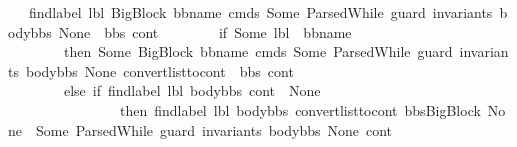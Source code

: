 \begin{isabellebody}
\ \ {\isacharbar}{\kern0pt}\ {\isachardoublequoteopen}find{\isacharunderscore}{\kern0pt}label\ lbl\ {\isacharparenleft}{\kern0pt}{\isacharparenleft}{\kern0pt}BigBlock\ bb{\isacharunderscore}{\kern0pt}name\ cmds\ {\isacharparenleft}{\kern0pt}Some\ {\isacharparenleft}{\kern0pt}ParsedWhile\ guard\ invariants\ body{\isacharunderscore}{\kern0pt}bbs{\isacharparenright}{\kern0pt}{\isacharparenright}{\kern0pt}\ None{\isacharparenright}{\kern0pt}\ {\isacharhash}{\kern0pt}\ bbs{\isacharparenright}{\kern0pt}\ cont\ {\isacharequal}{\kern0pt}\ \isanewline
\ \ \ \ \ \ {\isacharparenleft}{\kern0pt}if\ {\isacharparenleft}{\kern0pt}Some\ lbl\ {\isacharequal}{\kern0pt}\ bb{\isacharunderscore}{\kern0pt}name{\isacharparenright}{\kern0pt}\ \isanewline
\ \ \ \ \ \ \ \ then\ {\isacharparenleft}{\kern0pt}Some\ {\isacharparenleft}{\kern0pt}{\isacharparenleft}{\kern0pt}BigBlock\ bb{\isacharunderscore}{\kern0pt}name\ cmds\ {\isacharparenleft}{\kern0pt}Some\ {\isacharparenleft}{\kern0pt}ParsedWhile\ guard\ invariants\ body{\isacharunderscore}{\kern0pt}bbs{\isacharparenright}{\kern0pt}{\isacharparenright}{\kern0pt}\ None{\isacharparenright}{\kern0pt}{\isacharcomma}{\kern0pt}\ {\isacharparenleft}{\kern0pt}convert{\isacharunderscore}{\kern0pt}list{\isacharunderscore}{\kern0pt}to{\isacharunderscore}{\kern0pt}cont\ {\isacharparenleft}{\kern0pt}\ bbs{\isacharparenright}{\kern0pt}\ cont{\isacharparenright}{\kern0pt}{\isacharparenright}{\kern0pt}{\isacharparenright}{\kern0pt}\ \isanewline
\ \ \ \ \ \ \ \ else\ {\isacharparenleft}{\kern0pt}if\ {\isacharparenleft}{\kern0pt}find{\isacharunderscore}{\kern0pt}label\ lbl\ body{\isacharunderscore}{\kern0pt}bbs\ cont\ {\isasymnoteq}\ None{\isacharparenright}{\kern0pt}\ \isanewline
\ \ \ \ \ \ \ \ \ \ \ \ \ \ \ \ then\ {\isacharparenleft}{\kern0pt}find{\isacharunderscore}{\kern0pt}label\ lbl\ body{\isacharunderscore}{\kern0pt}bbs\ {\isacharparenleft}{\kern0pt}convert{\isacharunderscore}{\kern0pt}list{\isacharunderscore}{\kern0pt}to{\isacharunderscore}{\kern0pt}cont\ {\isacharparenleft}{\kern0pt}{\isacharparenleft}{\kern0pt}bbs{\isacharparenright}{\kern0pt}{\isacharat}{\kern0pt}{\isacharbrackleft}{\kern0pt}{\isacharparenleft}{\kern0pt}BigBlock\ None\ {\isacharbrackleft}{\kern0pt}{\isacharbrackright}{\kern0pt}\ {\isacharparenleft}{\kern0pt}Some\ {\isacharparenleft}{\kern0pt}ParsedWhile\ guard\ invariants\ body{\isacharunderscore}{\kern0pt}bbs{\isacharparenright}{\kern0pt}{\isacharparenright}{\kern0pt}\ None{\isacharparenright}{\kern0pt}{\isacharbrackright}{\kern0pt}{\isacharparenright}{\kern0pt}\ cont{\isacharparenright}{\kern0pt}{\isacharparenright}{\kern0pt}\ \isanewline

\end{isabellebody}
